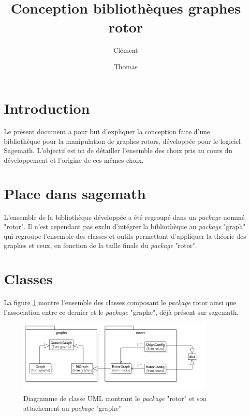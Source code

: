 \documentclass{article}
\title{Conception bibliothèques graphes rotor}
\author{Clément \bsc{Chrétien} \and Thomas \bsc{Petiteau}}
\begin{document}
	\maketitle
	\clearpage
	
	\tableofcontents
	\clearpage

	\section{Introduction}
	\paragraph*{}
	Le présent document a pour but d'expliquer la conception faite d'une bibliothèque pour la manipulation de graphes rotors, développée pour le logiciel Sagemath. L'objectif est ici de détailler l'ensemble des choix pris au cours du développement et l'origine de ces mêmes choix.
	
	\section{Place dans sagemath}
	\paragraph*{}
	L'ensemble de la bibliothèque développée a été regroupé dans un \textit{package} nommé "rotor". Il n'est cependant pas exclu d'intégrer la bibliothèque au \textit{package} "graph" qui regroupe l'ensemble des classes et outils permettant d'appliquer la théorie des graphes et ceux, en fonction de la taille finale du \textit{package} "rotor".
	
	\section{Classes}
	\paragraph*{}
	La figure \ref{fig:diagClassGlobal} montre l'ensemble des classes composant le \textit{package} rotor ainsi que l'association entre ce dernier et le \textit{package} "graphe", déjà présent sur sagemath.
	
	\begin{figure}[h]
		\includegraphics[width=10cm]{diagClassGlobal.png}
		\centering
		\caption{Diagramme de classe UML montrant le \textit{package} "rotor" et son attachement au \textit{package} "graphe"}
		\label{fig:diagClassGlobal}
	\end{figure}
\end{document}
